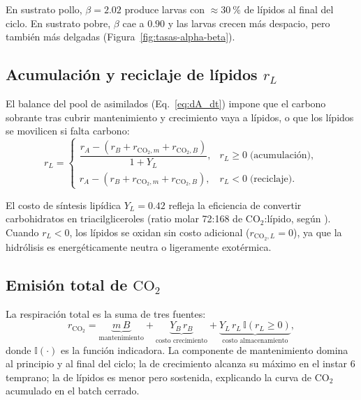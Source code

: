 En sustrato pollo, $\beta = \num{2.02}$ produce larvas con $\approx \SI{30}{\percent}$ de l\'{i}pidos al final del ciclo. En sustrato pobre, $\beta$ cae a $\num{0.90}$ y las larvas crecen m\'{a}s despacio, pero tambi\'{e}n m\'{a}s delgadas (Figura~\ref{fig:tasas-alpha-beta}).

\subsection{Acumulaci\'{o}n y reciclaje de l\'{i}pidos $r_L$}

El balance del pool de asimilados (Eq.~\ref{eq:dA_dt}) impone que el carbono sobrante tras cubrir mantenimiento y crecimiento vaya a l\'{i}pidos, o que los l\'{i}pidos se movilicen si falta carbono:
\begin{equation}
    r_L =
    \begin{cases}
        \dfrac{r_A - (r_B + r_{\mathrm{CO_2},m} + r_{\mathrm{CO_2},B})}{1 + Y_L}, & r_L \ge 0 \;\text{(acumulaci\'{o}n)}, \\[12pt]
        r_A - (r_B + r_{\mathrm{CO_2},m} + r_{\mathrm{CO_2},B}), & r_L < 0 \;\text{(reciclaje)}.
    \end{cases}
    \label{eq:rL}
\end{equation}

El costo de s\'{i}ntesis lip\'{i}dica $Y_L = \num{0.42}$ refleja la eficiencia de convertir carbohidratos en triacilgliceroles (ratio molar 72:168 de $\mathrm{CO_2}$:l\'{i}pido, seg\'{u}n \textcite{kokPreliminaryProjectDesign2021}). Cuando $r_L < 0$, los l\'{i}pidos se oxidan sin costo adicional ($r_{\mathrm{CO_2},L}=0$), ya que la hidr\'{o}lisis es energ\'{e}ticamente neutra o ligeramente exot\'{e}rmica.

\subsection{Emisi\'{o}n total de $\mathrm{CO_2}$}

La respiraci\'{o}n total es la suma de tres fuentes:
\begin{equation}
    r_{\mathrm{CO_2}} = \underbrace{m\,B}_{\text{mantenimiento}} + \underbrace{Y_B\,r_B}_{\text{costo crecimiento}} + \underbrace{Y_L\,r_L\,\mathbb{I}(r_L \ge 0)}_{\text{costo almacenamiento}},
    \label{eq:rCO2_total}
\end{equation}
donde $\mathbb{I}(\cdot)$ es la funci\'{o}n indicadora. La componente de mantenimiento domina al principio y al final del ciclo; la de crecimiento alcanza su m\'{a}ximo en el instar 6 temprano; la de l\'{i}pidos es menor pero sostenida, explicando la curva de $\mathrm{CO_2}$ acumulado en el batch cerrado.

